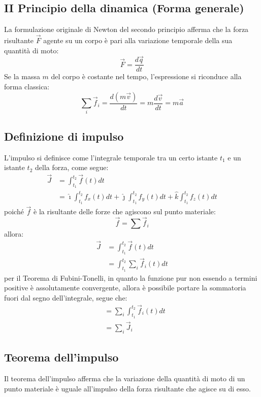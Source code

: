 \documentclass[11pt, a4paper, openright]{book}
\theoremstyle{plain}
\theoremstyle{definition}
\begin{document}
\subsection{II Principio della dinamica (Forma generale)}
La formulazione originale di Newton del secondo principio afferma che la forza risultante $\vec{F}$ agente su un corpo è pari alla variazione temporale della sua quantità di moto:
\begin{equation}
    \vec{F} = \frac{d\vec{q}}{dt}
\end{equation}
Se la massa $m$ del corpo è costante nel tempo, l'espressione si riconduce alla forma classica:
\[ \sum_i \vec{f}_i = \frac{d(m\vec{v})}{dt} = m \frac{d\vec{v}}{dt} = m\vec{a} \]

\subsection{Definizione di impulso}
L'impulso si definisce come l'integrale temporale tra un certo istante $t_1$ e un istante $t_2$ della forza, come segue:
\begin{align}
    \vec{J} & = \int_{t_1}^{t_2} \vec{f}(t)dt \\
            & = \hat{\imath}\int_{t_1}^{t_2} f_x(t)dt + \hat{\jmath}\int_{t_1}^{t_2} f_y(t)dt + \hat{k}\int_{t_1}^{t_2} f_z(t)dt 
\end{align}
poiché $\vec{f}$ è la risultante delle forze che agiscono sul punto materiale:
\[\vec{f} = \sum \vec{f}_i\]
allora:
\begin{align}
    \vec{J} & = \int_{t_1}^{t_2} \vec{f}(t)dt \\
    & = \int_{t_1}^{t_2} \sum_i\vec{f}_i(t)dt
\end{align}
per il Teorema di Fubini-Tonelli, in quanto la funzione pur non essendo a termini positive è assolutamente convergente, allora è possibile portare la sommatoria fuori dal segno dell'integrale, segue che:
\begin{align}
    & = \sum_i\int_{t_1}^{t_2} \vec{f}_i(t)dt \\
    & = \sum_i \vec{J}_i
\end{align}

\subsection{Teorema dell'impulso}
Il teorema dell'impulso afferma che la variazione della quantità di moto di un punto materiale è uguale all'impulso della forza risultante che agisce su di esso.
\end{document}
